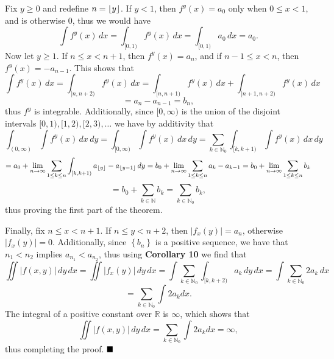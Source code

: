 \documentclass[12pt]{article}
\newcommand{\N}{\ensuremath{\mathbb{N}}}
\newcommand{\R}{\ensuremath{\mathbb{R}}}
\newcommand{\braceb}[1]{\left\{#1\right\}}
\newcommand{\vertb}[1]{\left\vert#1\right\vert}
\DeclarePairedDelimiter\floor{\lfloor}{\rfloor}
\newcommand{\done}{\ensuremath{\strut\hfill\blacksquare}}
\begin{document}
Fix \( y \geq 0 \) and redefine \( n = \floor{y} \).
If \( y < 1 \), then \( f^y(x) = a_0 \) only when \( 0 \leq x < 1 \),
and is otherwise 0, thus we would have
\[
	\int f^y(x) \, dx
	= \int_{[0,1)} f^y(x) \, dx
	= \int_{[0,1)} a_0 \, dx
	= a_0.
\]
Now let \( y \geq 1 \).
If \( n \leq x < n + 1 \), then \( f^y(x) = a_n \), and if
\( n - 1 \leq x < n \), then \( f^y(x) = -a_{n - 1} \).
This shows that
\[
	\int f^y(x) \, dx
	= \int_{[n, n + 2)} f^y(x) \, dx
	= \int_{[n, n + 1)} f^y(x) \, dx + \int_{[n + 1, n + 2)} f^y(x) \, dx
\]
\[
	= a_n - a_{n - 1} = b_n,
\]
thus \( f^y \) is integrable.
Additionally, since \( [0, \infty) \) is the union of the disjoint intervals
\( [0, 1), [1, 2), [2, 3), \dots \) we have by additivity that
\[
	\int_{(0,\infty)} \int f^y(x) \, dx \, dy
	= \int_{[0,\infty)} \int f^y(x) \, dx \, dy
	= \sum_{k \in \N_0} \int_{[k, k + 1)} \int f^y(x) \, dx \, dy
\]
\[
	= a_0 + \lim_{n \to \infty} \sum_{1 \leq k \leq n}
	\int_{[k, k + 1)} a_{\floor{y}} - a_{\floor{y - 1}} \, dy
	= b_0 + \lim_{n \to \infty} \sum_{1 \leq k \leq n} a_k - a_{k - 1}
	= b_0 + \lim_{n \to \infty} \sum_{1 \leq k \leq n} b_k
\]
\[
	= b_0 + \sum_{k \in \N} b_k
	= \sum_{k \in \N_0} b_k,
\]
thus proving the first part of the theorem.

Finally, fix \( n \leq x < n + 1 \). If \( n \leq y < n + 2 \), then
\( \vertb{f_x(y)} = a_n \), otherwise \( \vertb{f_x(y)} = 0 \).
Additionally, since \( \braceb{b_n} \) is a positive sequence, we have that
\( n_1 < n_2 \) implies \( a_{n_1} < a_{n_2} \), thus using
\textbf{Corollary 10} we find that
\[
	\iint \vertb{f(x,y)} \, dy \, dx
	= \iint \vertb{f_x(y)} \, dy \, dx
	= \int \sum_{k \in \N_0} \int_{[k, k + 2)} a_k \, dy \, dx
	= \int \sum_{k \in \N_0} 2a_k \, dx
\]
\[
	= \sum_{k \in \N_0} \int 2a_k dx.
\]
The integral of a positive constant over \( \R \) is \( \infty \), which
shows that
\[
	\iint \vertb{f(x,y)} \, dy \, dx
	= \sum_{k \in \N_0} \int 2a_k dx
	= \infty,
\]
thus completing the proof.
\done
\end{document}
